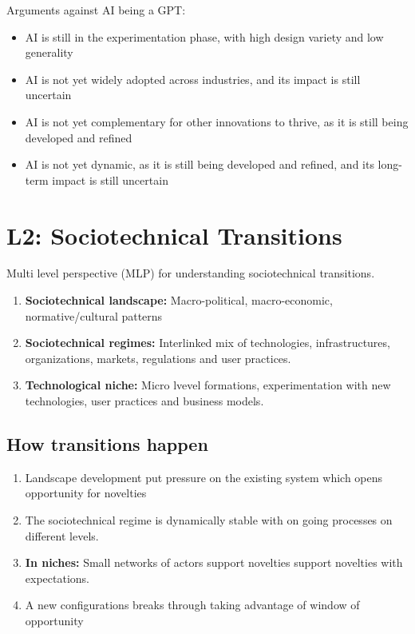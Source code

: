 \documentclass[12pt,a4paper]{article}
\begin{document}
Arguments against AI being a GPT:
\begin{itemize}
    \item AI is still in the experimentation phase, with high design variety and low generality
    \item AI is not yet widely adopted across industries, and its impact is still uncertain
    \item AI is not yet complementary for other innovations to thrive, as it is still being developed and refined
    \item AI is not yet dynamic, as it is still being developed and refined, and its long-term impact is still uncertain
\end{itemize}

\section{L2: Sociotechnical Transitions}
Multi level perspective (MLP) for understanding sociotechnical transitions.
\begin{enumerate}
    \item \textbf{Sociotechnical landscape:} Macro-political, macro-economic, normative/cultural patterns
    \item \textbf{Sociotechnical regimes:} Interlinked mix of technologies, infrastructures, organizations, markets, regulations and user practices.
    \item \textbf{Technological niche:} Micro lvevel formations, experimentation with new technologies, user practices and business models.
\end{enumerate}

\subsection{How transitions happen}
\begin{enumerate}
    \item Landscape development put pressure on the existing system which opens opportunity for novelties
    \item The sociotechnical regime is dynamically stable with on going processes on different levels.
    \item \textbf{In niches:} Small networks of actors support novelties support novelties with expectations.
    \item A new configurations breaks through taking advantage of window of opportunity
\end{enumerate}
\end{document}
